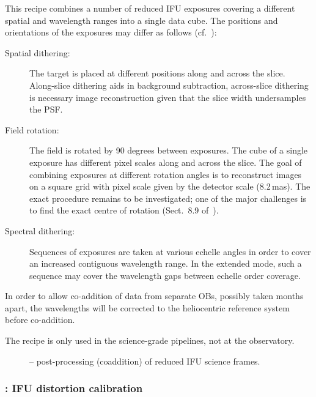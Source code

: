 This recipe combines a number of reduced IFU exposures covering a
different spatial and wavelength ranges into a single data cube. The
positions and orientations of the exposures may differ as follows (cf.~\cite{METIS-operational_concept}): %
\begin{description}
\item[Spatial dithering:] The target is placed at different positions
  along and across the slice. Along-slice dithering aids in background
  subtraction, across-slice dithering is necessary image
  reconstruction given that the slice width undersamples the PSF\@.
\item[Field rotation:] The field is rotated by 90 degrees between
  exposures. The cube of a single exposure has different pixel scales
  along and across the slice. The goal of combining exposures at
  different rotation angles is to reconstruct images on a square grid
  with pixel scale given by the detector scale (8.2\,mas). The exact
  procedure remains to be investigated; one of the major challenges is
  to find the exact centre of rotation
  (Sect.~8.9 of~\cite{DRLS}).
\item[Spectral dithering:] Sequences of exposures are taken at various
  echelle angles in order to cover an increased contiguous wavelength
  range. In the extended mode, such a sequence may cover the
  wavelength gaps between echelle order coverage.
\end{description}

In order to allow co-addition of data from separate OBs, possibly taken
months apart, the wavelengths will be corrected to the heliocentric
reference system before co-addition.

The recipe is only used in the science-grade pipelines, not at the
observatory.



\begin{figure}[hb]
  \centering
    \def \globalscale {0.700000}
    \fontsize{10}{12}\selectfont
    
  \caption[Recipe: ]{%
     -- post-processing (coaddition) of
    reduced IFU science frames.}
  \label{fig:metis_ifu_sci_postprocess}
\end{figure}


\clearpage
\subsubsection{: IFU distortion calibration}
\label{sssec:ifu_distortion}
\label{rec:metis_ifu_distortion}

